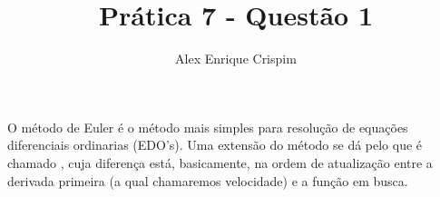 


\title{Prática 7 - Questão 1}
\author{Alex Enrique Crispim}
\maketitle

O método de Euler é o método mais simples para resolução de equações diferenciais ordinarias (EDO's). Uma extensão do método se dá pelo que é chamado , cuja diferença está, basicamente, na ordem de atualização entre a derivada primeira (a qual chamaremos velocidade) e a função em busca. 




